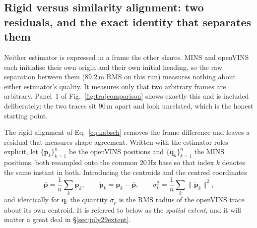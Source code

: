 \subsection{Rigid versus similarity alignment: two residuals, and the exact
identity that separates them}
\label{sec:july29align}
Neither estimator is expressed in a frame the other shares. MINS and
openVINS each initialise their own origin and their own initial heading, so
the raw separation between them ($89.2$\,m RMS on this run) measures
nothing about either estimator's quality. It measures only that two
arbitrary frames are arbitrary. Panel~1 of Fig.~\ref{fig:trajcomparison}
shows exactly this and is included deliberately: the two traces sit $90$\,m
apart and look unrelated, which is the honest starting point.

The rigid alignment of Eq.~\ref{eq:kabsch} removes the frame difference and
leaves a residual that measures shape agreement. Written with the estimator
roles explicit, let $\{\mathbf{p}_k\}_{k=1}^{n}$ be the openVINS positions
and $\{\mathbf{q}_k\}_{k=1}^{n}$ the MINS positions, both resampled onto the
common $20$\,Hz base so that index $k$ denotes the same instant in both.
Introducing the centroids and the centred coordinates
\begin{equation}
\bar{\mathbf{p}}=\frac1n\sum_k \mathbf{p}_k,\qquad
\tilde{\mathbf{p}}_k=\mathbf{p}_k-\bar{\mathbf{p}},\qquad
\sigma_p^{2}=\frac1n\sum_k\lVert\tilde{\mathbf{p}}_k\rVert^{2},
\label{eq:centroids}
\end{equation}
and identically for $\mathbf{q}$, the quantity $\sigma_p$ is the RMS radius
of the openVINS trace about its own centroid. It is referred to below as the
\emph{spatial extent}, and it will matter a great deal in
\S\ref{sec:july29extent}.

